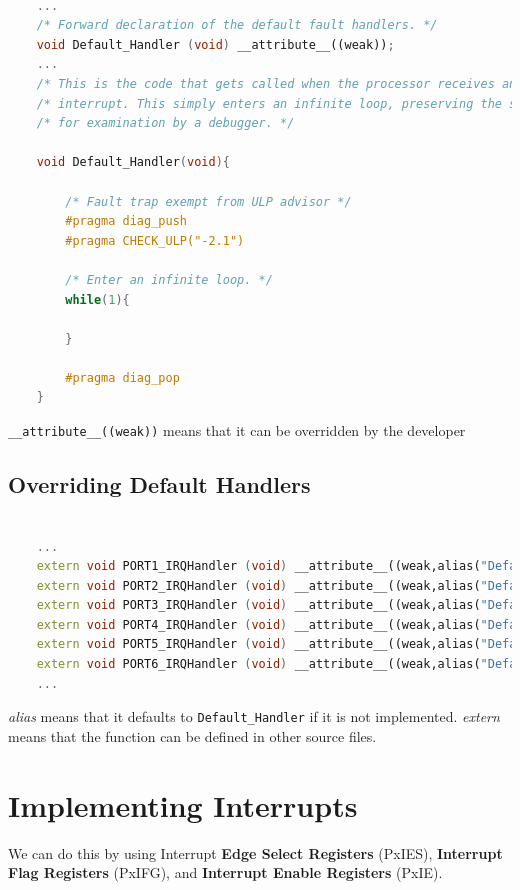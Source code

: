 \begin{lstlisting}[language=c++]

    ...
    /* Forward declaration of the default fault handlers. */
    void Default_Handler (void) __attribute__((weak));
    ...
    /* This is the code that gets called when the processor receives an unexpected */
    /* interrupt. This simply enters an infinite loop, preserving the system state */
    /* for examination by a debugger. */
    
    void Default_Handler(void){
    
        /* Fault trap exempt from ULP advisor */
        #pragma diag_push
        #pragma CHECK_ULP("-2.1")
        
        /* Enter an infinite loop. */
        while(1){
        
        }
        
        #pragma diag_pop
    }
\end{lstlisting}


\verb|__attribute__((weak))| means that it can be overridden by the developer

\subsection{Overriding Default Handlers}

\begin{lstlisting}[language=c++]

    ...
    extern void PORT1_IRQHandler (void) __attribute__((weak,alias("Default_Handler")));
    extern void PORT2_IRQHandler (void) __attribute__((weak,alias("Default_Handler")));
    extern void PORT3_IRQHandler (void) __attribute__((weak,alias("Default_Handler")));
    extern void PORT4_IRQHandler (void) __attribute__((weak,alias("Default_Handler")));
    extern void PORT5_IRQHandler (void) __attribute__((weak,alias("Default_Handler")));
    extern void PORT6_IRQHandler (void) __attribute__((weak,alias("Default_Handler")));
    ...
\end{lstlisting}

\textit{alias} means that it defaults to \verb|Default_Handler| if it is not implemented.
\textit{extern} means that the function can be defined in other source files.


\section{Implementing Interrupts}

We can do this by using Interrupt \textbf{Edge Select Registers} (PxIES), \textbf{Interrupt Flag Registers} (PxIFG),
and \textbf{Interrupt Enable Registers} (PxIE).

